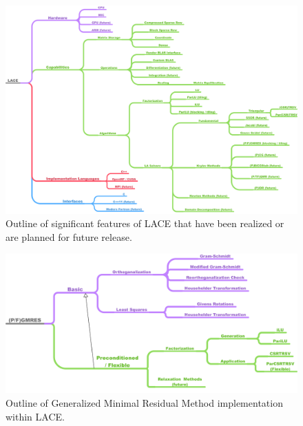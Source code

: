 \documentclass[12pt,portrait]{article}
\begin{document}
\begin{landscape}
\begin{figure}[ht]\centering
  \includegraphics[width=\columnwidth]{../images/LACE_1c.png}
  \caption{Outline of significant features of LACE that have been realized or are planned for future release.}
  \vspace{-10pt}
  \label{fig:LACE}
\end{figure}
\end{landscape}
\begin{landscape}
\begin{figure}[ht]\centering
  \includegraphics[width=\columnwidth]{../images/GMRES_1b.png}
  \caption{Outline of Generalized Minimal Residual Method implementation within LACE.}
  \vspace{-10pt}
  \label{fig:LACE_GMRES}
\end{figure}
\end{landscape}
\end{document}

